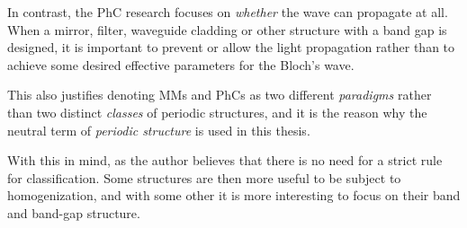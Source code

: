 In contrast, the PhC research focuses on \textit{whether} the wave can propagate at all. When a mirror, filter, waveguide cladding or other structure with a band gap is designed, it is important to prevent or allow the light propagation rather than to achieve some desired effective parameters for the Bloch's wave. 

This also justifies denoting MMs and PhCs as two different \textit{paradigms} rather than two distinct \textit{classes} of periodic structures, and it is the reason why the neutral term of \textit{periodic structure} is used in this thesis. 

With this in mind, as the author believes that there is no need for a strict rule for classification. Some structures are then more useful to be subject to homogenization, and with some other it is more interesting to focus on their band and band-gap structure. 



